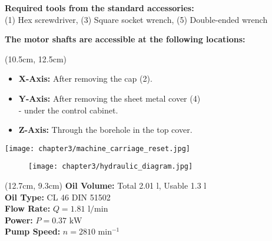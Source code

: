 
\textbf{Required tools from the standard accessories:}\\
(1) Hex screwdriver, (3) Square socket wrench, (5) Double-ended wrench

\vspace{2cm}

\textbf{The motor shafts are accessible at the following locations:}  

\begin{textblock*}{\textwidth}(10.5cm, 12.5cm)
\begin{itemize}
    \item \textbf{X-Axis:} After removing the cap (2).  
    \item \textbf{Y-Axis:} After removing the sheet metal cover (4) \\- under the control cabinet.  
    \item \textbf{Z-Axis:} Through the borehole in the top cover.  
\end{itemize}

\vspace{0.3cm}


\end{textblock*}

\begin{minipage}{\textwidth}
    \centering
    \texttt{[image: chapter3/machine\_carriage\_reset.jpg]}
\end{minipage}

\setcounter{section}{18}

\begin{figure}[h]
    \centering
    \texttt{[image: chapter3/hydraulic\_diagram.jpg]}
\end{figure}

\begin{textblock*}{\textwidth}(12.7cm, 9.3cm)
    \textbf{Oil Volume:} Total 2.01 l, Usable 1.3 l \\
    \textbf{Oil Type:} CL 46 DIN 51502 \\
    \textbf{Flow Rate:} $Q = 1.81 \text{ l/min}$ \\
    \textbf{Power:} $P = 0.37 \text{ kW}$ \\
    \textbf{Pump Speed:} $n = 2810 \text{ min}^{-1}$
\end{textblock*}

